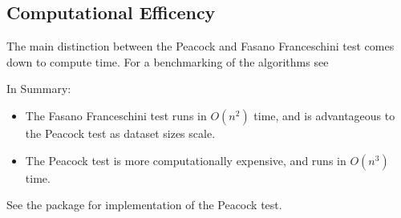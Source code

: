 \documentclass[codesnippet]{jss}
\begin{document}
\subsection{Computational Efficency}
The main distinction between the Peacock and Fasano Franceschini test comes down to compute time. For a benchmarking of the algorithms see \citep{Lopes2007}

In Summary:
\begin{itemize}
\item The Fasano Franceschini test runs in $O(n^2)$ time, and is advantageous to the Peacock test as dataset sizes scale.
\item The Peacock test is more computationally expensive, and runs in $O(n^3)$ time.
\end{itemize}

See the  package for  implementation of the Peacock test.
\end{document}
